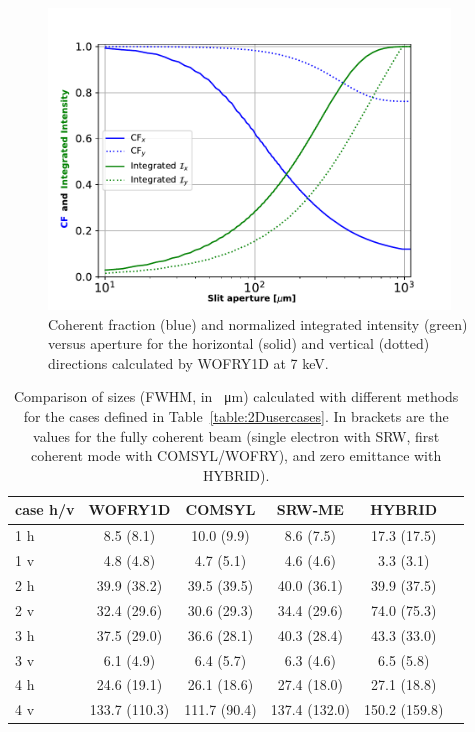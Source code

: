\documentclass{iucr}
\begin{document}
\begin{figure}
    \label{fig:CFvsGap}
    \includegraphics[width=0.95\textwidth]{figures/CFvsGap.pdf}
    \caption{Coherent fraction (blue) and normalized integrated intensity (green) versus aperture for the horizontal (solid) and vertical (dotted) directions calculated by WOFRY1D at 7 keV.
    }
\end{figure}

\begin{table}[]
    \label{table:comparison}
    \caption{Comparison of sizes (FWHM, in \SI{}{\micro\meter}) calculated with different methods for the cases defined in Table~\ref{table:2Dusercases}.
    In brackets are the values for the fully coherent beam (single electron with SRW, first coherent mode with COMSYL/WOFRY), and zero emittance with HYBRID). \vspace{5mm}
    }
    \centering
    \begin{tabular}
    {p{}|c|c|c|c|c}
         case h/v &
         WOFRY1D&
         COMSYL&
         SRW-ME&
         HYBRID \\
         \hline
1 h  & 8.5 (8.1)    & 10.0 (9.9)  & 8.6 (7.5)   & 17.3 (17.5) \\
1 v  & 4.8 (4.8)    & 4.7 (5.1)   & 4.6 (4.6)   & 3.3 (3.1) \\
\hline
2 h  & 39.9 (38.2)  & 39.5 (39.5) & 40.0 (36.1)  & 39.9 (37.5) \\
2 v  & 32.4 (29.6)  & 30.6 (29.3) & 34.4 (29.6)  & 74.0 (75.3) \\
\hline
3 h  & 37.5 (29.0)  & 36.6 (28.1) & 40.3 (28.4)  & 43.3 (33.0) \\
3 v  & 6.1 (4.9)   & 6.4 (5.7)   & 6.3 (4.6)    & 6.5 (5.8) \\
\hline
4 h  & 24.6 (19.1)  & 26.1 (18.6)  & 27.4 (18.0)   & 27.1 (18.8) \\
4 v  & 133.7 (110.3)& 111.7 (90.4) & 137.4 (132.0) & 150.2 (159.8) \\
    \end{tabular}
\end{table}
\end{document}
